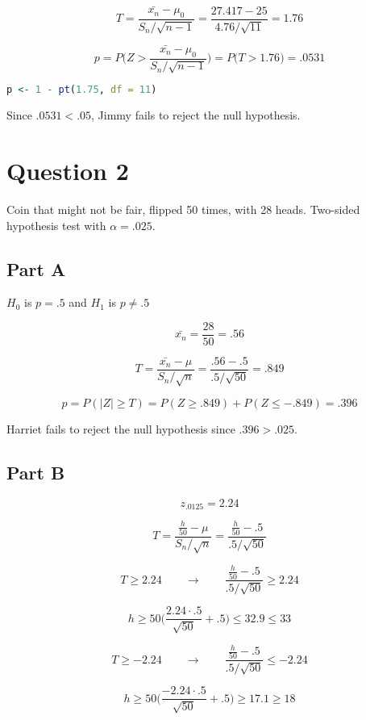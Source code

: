 \documentclass[letterpaper]{article}
\begin{document}
$$T = \frac{\bar{x_n} - \mu_0}{S_n / \sqrt{n-1}} = \frac{27.417 - 25}{4.76 / \sqrt{11}} = 1.76$$

$$p = P \Big( Z > \frac{\bar{x_n} - \mu_0}{S_n / \sqrt{n-1}} \Big) = P \Big( T > 1.76 \Big) = .0531$$

\begin{lstlisting}[language=R]
    p <- 1 - pt(1.75, df = 11)
\end{lstlisting}

\noindent Since $.0531 < .05$, Jimmy fails to reject the null hypothesis.

\newpage

\section*{Question 2}

Coin that might not be fair, flipped 50 times, with 28 heads. Two-sided hypothesis test with $\alpha = .025$.

\subsection*{Part A}

$H_0$ is $p = .5$ and $H_1$ is $p \neq .5$

$$\bar{x_n} = \frac{28}{50} = .56$$

$$T = \frac{\bar{x_n} - \mu}{S_n / \sqrt{n}} = \frac{.56 - .5}{.5 / \sqrt{50}} = .849$$

$$p = P(|Z| \geq T) = P(Z \geq .849) + P(Z \leq -.849) = .396$$

\noindent Harriet fails to reject the null hypothesis since $.396 > .025$.

\subsection*{Part B}

$$z_{.0125} = 2.24$$

$$T = \frac{\frac{h}{50} - \mu}{S_n / \sqrt{n}} = \frac{\frac{h}{50} - .5}{.5 / \sqrt{50}}$$

$$T \geq 2.24 \qquad \longrightarrow \qquad \frac{\frac{h}{50} - .5}{.5 / \sqrt{50}} \geq 2.24$$

$$h \geq 50 \Big( \frac{2.24 \cdot .5}{\sqrt{50}} + .5 \Big) \leq 32.9 \leq 33$$

$$T \geq -2.24 \qquad \longrightarrow \qquad \frac{\frac{h}{50} - .5}{.5 / \sqrt{50}} \leq -2.24$$

$$h \geq 50 \Big( \frac{-2.24 \cdot .5}{\sqrt{50}} + .5 \Big) \geq 17.1 \geq 18$$
\end{document}
